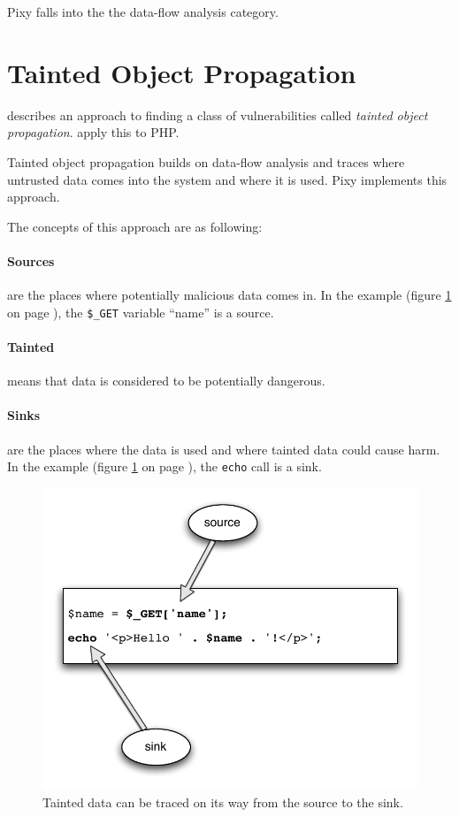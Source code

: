 Pixy falls into the the data-flow analysis category.

\section{Tainted Object Propagation}
\label{tainting}
\cite{finding-security-vulnerabilities} describes an approach to finding a class of vulnerabilities called \emph{tainted object propagation}. \cite{pixy-short, pixy-long, pixy-dissertation} apply this to PHP.

Tainted object propagation builds on data-flow analysis and traces where untrusted data comes into the system and where it is used. Pixy implements this approach.

The concepts of this approach are as following:
\paragraph{Sources} are the places where potentially malicious data comes in. In the example (figure \ref{fig:taint} on page \pageref{fig:taint}), the \texttt{\$\_GET} variable ``name'' is a source.
\paragraph{Tainted} means that data is considered to be potentially dangerous.
\paragraph{Sinks} are the places where the data is used and where tainted data could cause harm. In the example (figure \ref{fig:taint} on page \pageref{fig:taint}), the \texttt{echo} call is a sink.

\begin{figure}[!h]
  \includegraphics[scale=0.8]{images/taint}
  \caption{Tainted data can be traced on its way from the source to the sink.}
  \label{fig:taint}
\end{figure}

